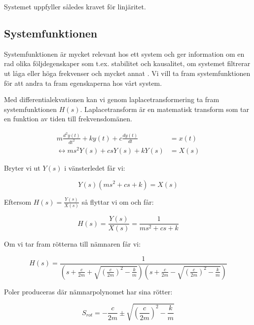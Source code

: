 \documentclass[10pt,a4paper]{article}
\begin{document}
Systemet uppfyller således kravet för linjäritet.





\subsection{Systemfunktionen}

Systemfunktionen är mycket relevant hos ett system och ger information om en rad olika följdegenskaper som t.ex. stabilitet och kausalitet, om systemet filtrerar ut låga eller höga frekvenser och mycket annat \cite[s.~170]{sune2000}. Vi vill ta fram systemfunktionen för att andra ta fram egenskaperna hos vårt system.

Med differentialekvationen kan vi genom laplacetransformering ta fram systemfunktionen $H(s)$. Laplacetransform är en matematisk transform som tar en funktion av tiden till frekvensdomänen. %

\begin{equation}
\begin{split}
 m\frac{d^2y(t)}{dt^2} + k  y(t) + c\frac{dy(t)}{dt} & = x(t) \\ \leftrightarrow m  s^2  Y(s) + c  s  Y(s) + k  Y(s) & = X(s)
\end{split}
\end{equation}

Bryter vi ut $Y(s)$ i vänsterledet får vi:

\begin{equation}
Y(s)(m  s^2 + c  s + k) = X(s)
\end{equation}

Eftersom $H(s) = \frac{Y(s)}{X(s)}$ så flyttar vi om och får:

\begin{equation}
H(s) = \frac{Y(s)}{X(s)} = \frac{1}{m s^2 + c  s + k}
\end{equation}

Om vi tar fram rötterna till nämnaren får vi:

\begin{equation}
H(s)= \frac{1}{(s + \frac{c}{2 m} + \sqrt{ (\frac{c}{2  m})^2 - \frac{k}{m}}) (s + \frac{c}{2  m} - \sqrt{ (\frac{c}{2  m})^2 - \frac{k}{m}})}
\end{equation}

Poler produceras där nämnarpolynomet har sina rötter:

\begin{equation}
S_{rot}=-\frac{c}{2m} \pm \sqrt{(\frac{c}{2m})^2-\frac{k}{m}}
\end{equation}
\end{document}
